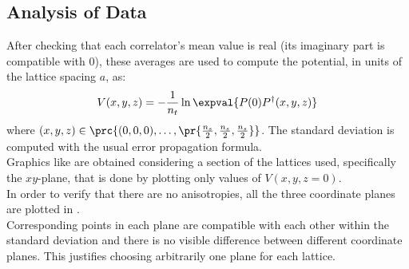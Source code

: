 \subsection{Analysis of Data}
After checking that each correlator's mean value is real (its imaginary part is compatible with $0$), these averages are used to compute the potential, in units of the lattice spacing $a$, as:
\begin{equation}
    V(x,y,z) = -\frac{1}{n_t}\ln\expval{P(0)P^\dagger(x,y,z)} \label{4:Potential}
\end{equation}
where $(x,y,z)\in\prc{(0,0,0),\dots,\pr{\frac{n_s}{2},\frac{n_s}{2},\frac{n_s}{2}}}$.
The standard deviation is computed with the usual error propagation formula.\\
Graphics like  are obtained considering a section of the lattices used, specifically the $xy$-plane, that is done by plotting only values of $V(x,y,z=0)$.\\
In order to verify that there are no anisotropies, all the three coordinate planes are plotted in .\\
Corresponding points in each plane are compatible with each other within the standard deviation and there is no visible difference between different coordinate planes.
This justifies choosing arbitrarily one plane for each lattice.
